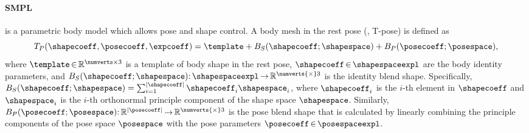 \paragraph{SMPL~\cite{SMPL:2015}} is a parametric body model which allows pose and shape control. 
%
A body mesh in the rest pose (\ie, T-pose) is defined as
%
\begin{equation}
    T_P(\shapecoeff,\posecoeff, \expcoeff) = \template + B_{S}(\shapecoeff;\shapespace) +  B_{P}(\posecoeff;\posespace),
\end{equation}
%
where $\template \, {\in} \, \mathbb{R}^{\numverts \times 3}$ is a template of body shape in the rest pose, 
%
$\shapecoeff \, {\in} \, \shapespaceexpl$ are the body identity parameters, 
%
and $B_{S}(\shapecoeff;\shapespace){:} \, \shapespaceexpl \, {\rightarrow} \, \mathbb{R}^{\numverts {\times} 3}$ is the identity blend shape.
%
%
Specifically, $B_S(\shapecoeff;\shapespace)=\sum_{i=1}^{|\shapecoeff|}\shapecoeff_i\shapespace_i$, where $\shapecoeff_i$ is the $i$-th element in $\shapecoeff$ and $\shapespace_i$ is the $i$-th orthonormal principle component of the shape space $\shapespace$. 
%
Similarly, $B_{P}(\posecoeff;\posespace){:} \, \mathbb{R}^{|\posecoeff|} \, {\rightarrow} \, \mathbb{R}^{\numverts {\times} 3}$ is the pose blend shape that is calculated by linearly combining the principle components of the pose space $\posespace$ with the pose parameters $\posecoeff \, {\in} \, \posespaceexpl$.
%


